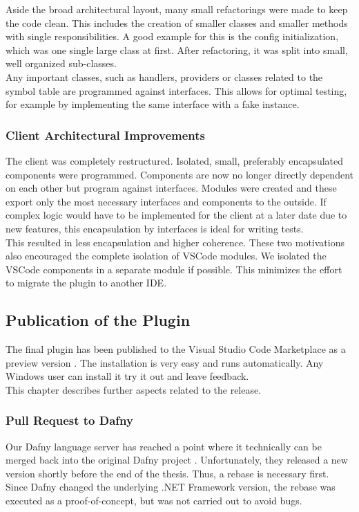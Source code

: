 Aside the broad architectural layout, many small refactorings were made to keep the code clean.
This includes the creation of smaller classes and smaller methods with single responsibilities.
A good example for this is the config initialization, which was one single large class at first.
After refactoring, it was split into small, well organized sub-classes.\\

Any important classes, such as handlers, providers or classes related to the symbol table are programmed against interfaces.
This allows for optimal testing, for example by implementing the same interface with a fake instance.

\subsubsection{Client Architectural Improvements}
The client was completely restructured.
Isolated, small, preferably encapsulated components were programmed.
Components are now no longer directly dependent on each other but program against interfaces.
Modules were created and these export only the most necessary interfaces and components to the outside.
If complex logic would have to be implemented for the client at a later date due to new features,
this encapsulation by interfaces is ideal for writing tests. \\

This resulted in less encapsulation and higher coherence.
These two motivations also encouraged the complete isolation of VSCode modules.
We isolated the VSCode components in a separate module if possible.
This minimizes the effort to migrate the plugin to another IDE.


\subsection{Publication of the Plugin}
The final plugin has been published to the Visual Studio Code Marketplace as a preview version \cite{our-dafny-plugin}.
The installation is very easy and runs automatically.
Any Windows user can install it \textendash{} try it out and leave feedback.\\

This chapter describes further aspects related to the release.

\subsubsection{Pull Request to Dafny}
Our Dafny language server has reached a point where it technically can be merged back into the original Dafny project \cite{dafny_lang_github}.
Unfortunately, they released a new version shortly before the end of the thesis.
Thus, a rebase is necessary first.
Since Dafny changed the underlying .NET Framework version, the rebase was executed as a proof-of-concept, but was not carried out to avoid bugs.\\

